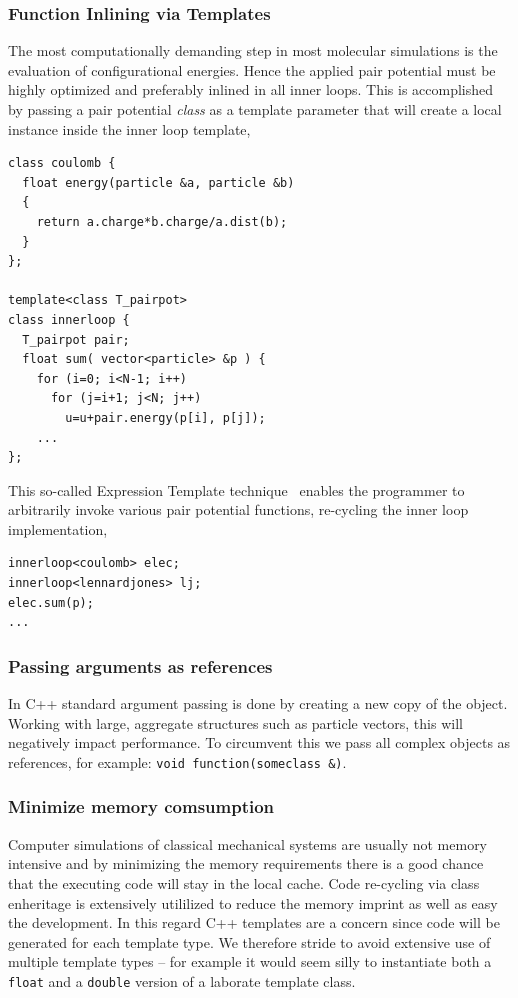 \documentclass[10pt]{bmc_article}
\newenvironment{bmcformat}{\fussy\setboolean{publ}{true}}{\fussy}
\begin{document}
\begin{bmcformat}
\subsubsection*{Function Inlining via Templates}
The most computationally demanding step in most molecular simulations is the evaluation of configurational energies.
Hence the applied pair potential must be highly optimized and preferably inlined in all inner loops.
This is accomplished by passing a pair potential \emph{class} as a template parameter that will create a local instance inside the inner loop template,
\begin{verbatim}
class coulomb {
  float energy(particle &a, particle &b)
  {
    return a.charge*b.charge/a.dist(b);
  }
};

template<class T_pairpot>
class innerloop {
  T_pairpot pair;
  float sum( vector<particle> &p ) {
    for (i=0; i<N-1; i++)
      for (j=i+1; j<N; j++) 
        u=u+pair.energy(p[i], p[j]);
    ...
};
\end{verbatim}
This so-called Expression Template technique~\cite{veldhuizen:95} enables the programmer to arbitrarily invoke various pair potential functions, re-cycling the inner loop implementation,
\begin{verbatim}
innerloop<coulomb> elec;
innerloop<lennardjones> lj;
elec.sum(p);
...
\end{verbatim}

\subsubsection*{Passing arguments as references}
In C++ standard argument passing is done by creating a new copy of the object.
Working with large, aggregate structures such as particle vectors, this will negatively impact performance. To circumvent this we pass all complex objects as references, for example: \verb"void function(someclass &)".

\subsubsection*{Minimize memory comsumption}
Computer simulations of classical mechanical systems are usually not memory intensive and by minimizing the memory requirements there is a good chance that the executing code will stay in the local cache.
Code re-cycling via class enheritage is extensively utililized to reduce the memory imprint as well as easy the development.
In this regard C++ templates are a concern since code will be generated for each template type.
We therefore stride to avoid extensive use of multiple template types -- for example it would seem silly to instantiate both a \verb"float" and a \verb"double" version of a laborate template class.


\end{bmcformat}
\end{document}
